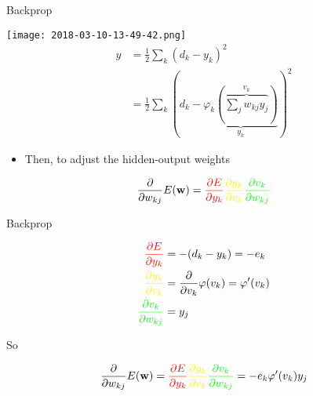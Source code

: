 \documentclass[notes]{beamer}
\providecommand{\tightlist}{%
  \setlength{\itemsep}{0pt}\setlength{\parskip}{0pt}}
\begin{document}
\begin{frame}{Backprop}

\centering 

\texttt{[image: 2018-03-10-13-49-42.png]}\\

\begin{align}\label{eq:pqFormel}
    y & = \frac{1}{2} \sum_k (d_k - y_k)^2 \\ %
      & =  \frac{1}{2}\sum_k \left(
        d_k - \underbrace{\varphi_k 
        \left( \overbrace{\sum_j w_{kj} y_j}^{v_k} \right)
         }_{y_k}
      \right)^2 
\end{align}

\begin{itemize}
\tightlist
\item
  Then, to adjust the hidden-output weights
\end{itemize}

\begin{equation}
    \frac{\partial }{\partial w_{kj}} E(\vw) = 
    \textcolor{red}{
        \frac{\partial E}{\partial y_k}} 
    \textcolor{yellow}{
        \frac{\partial y_k}{\partial v_k}
    } 
    \textcolor{green}{
        \frac{\partial v_k}{\partial w_{kj}}
    }
\end{equation}

\end{frame}

\begin{frame}{Backprop}

\begin{align}
    \textcolor{red}{
    \frac{\partial E}{\partial y_k}} & = -(d_k - y_k) = -e_k                                           \\
    \textcolor{yellow}{
        \frac{\partial y_k}{\partial v_k}
    }                                & = \frac{\partial }{\partial v_k} \varphi (v_k) = \varphi ' (v_k) \\
    \textcolor{green}{
        \frac{\partial v_k}{\partial w_{kj}}
    }                                & = y_j
\end{align}

So

\begin{equation}
  \frac{\partial }{\partial w_{kj}} E(\vw) = 
    \textcolor{red}{
        \frac{\partial E}{\partial y_k}} 
    \textcolor{yellow}{
        \frac{\partial y_k}{\partial v_k}
    } 
    \textcolor{green}{
        \frac{\partial v_k}{\partial w_{kj}}
    } = -e_k \varphi ' (v_k) y_j 
\end{equation}

\end{frame}
\end{document}
